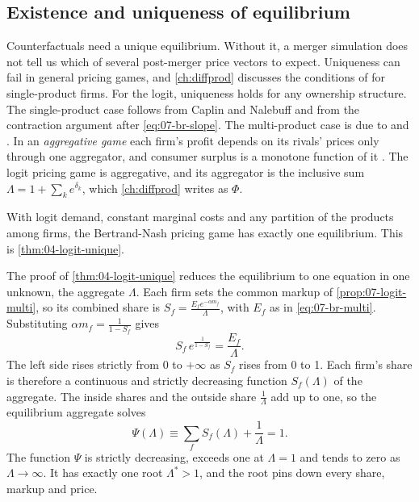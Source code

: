 \subsection{Existence and uniqueness of equilibrium}\label{sec:07-uniqueness}

Counterfactuals need a unique equilibrium. Without it, a merger simulation does not tell us which of several
post-merger price vectors to expect. Uniqueness can fail in general pricing games, and \cref{ch:diffprod} discusses the
conditions of \citet{CaplinNalebuff1991} for single-product firms. For the logit, uniqueness holds for any ownership
structure. The single-product case follows from Caplin and Nalebuff and from the contraction argument after
\eqref{eq:07-br-slope}. The multi-product case is due to \citet[Theorem~7, p.~279]{KonovalovSandor2010} and
\citet{NockeSchutz2018}.
In an \emph{aggregative game} each firm's profit depends on its rivals' prices only through one aggregator, and
consumer surplus is a monotone function of it \citep[p.~229, n.~127]{AskerNocke2021}. The logit pricing game is
aggregative, and its aggregator is the inclusive sum $\Lambda = 1 + \sum_k e^{\delta_k}$, which \cref{ch:diffprod}
writes as $\Phi$.

\begin{proposition}\label{prop:07-logit-unique}
With logit demand, constant marginal costs and any partition of the products among firms, the Bertrand-Nash pricing
game has exactly one equilibrium. This is \cref{thm:04-logit-unique}.
\end{proposition}

The proof of \cref{thm:04-logit-unique} reduces the equilibrium to one equation in one unknown, the aggregate
$\Lambda$. Each firm sets the common markup of \cref{prop:07-logit-multi}, so its combined share is $S_f = \frac{E_f
e^{-\alpha m_f}}{\Lambda}$, with $E_f$ as in \eqref{eq:07-br-multi}. Substituting $\alpha m_f = \frac{1}{1 - S_f}$
gives
\begin{equation}\label{eq:07-share-aggregate}
  S_f\, e^{\frac{1}{1 - S_f}} = \frac{E_f}{\Lambda} .
\end{equation}
The left side rises strictly from 0 to $+\infty$ as $S_f$ rises from 0 to 1. Each firm's share is therefore a
continuous and strictly decreasing function $S_f(\Lambda)$ of the aggregate. The inside shares and the outside share
$\frac{1}{\Lambda}$ add up to one, so the equilibrium aggregate solves
\begin{equation}\label{eq:07-psi}
  \Psi(\Lambda) \equiv \sum_f S_f(\Lambda) + \frac{1}{\Lambda} = 1 .
\end{equation}
The function $\Psi$ is strictly decreasing, exceeds one at $\Lambda = 1$ and tends to zero as $\Lambda \to \infty$.
It has exactly one root $\Lambda^* > 1$, and the root pins down every share, markup and price.

